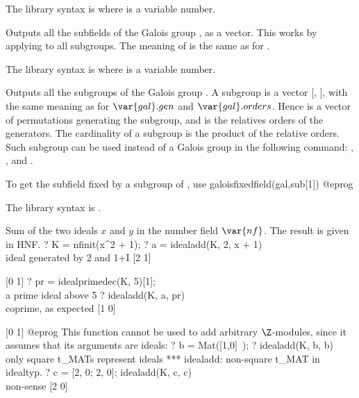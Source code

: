 The library syntax is  where  is a variable number.

\label{se:galoissubfields}
Outputs all the subfields of the Galois group , as a vector.
This works by applying  to all subgroups. The meaning of
 is the same as for .

The library syntax is  where  is a variable number.

\label{se:galoissubgroups}
Outputs all the subgroups of the Galois group . A subgroup is a
vector [, ], with the same meaning
as for $\var{gal}.gen$ and $\var{gal}.orders$. Hence  is a vector of
permutations generating the subgroup, and  is the relatives
orders of the generators. The cardinality of a subgroup is the product of the
relative orders. Such subgroup can be used instead of a Galois group in the
following command: , ,
 and .

To get the subfield fixed by a subgroup  of , use
\bprog
galoisfixedfield(gal,sub[1])
@eprog

The library syntax is .

\label{se:idealadd}
Sum of the two ideals $x$ and $y$ in the number field $\var{nf}$. The
result is given in HNF.
\bprog
 ? K = nfinit(x^2 + 1);
 ? a = idealadd(K, 2, x + 1)  \\ ideal generated by 2 and 1+I
 [2 1]

 [0 1]
 ? pr = idealprimedec(K, 5)[1];  \\ a prime ideal above 5
 ? idealadd(K, a, pr)     \\ coprime, as expected
 [1 0]

 [0 1]
@eprog\noindent
This function cannot be used to add arbitrary $\Z$-modules, since it assumes
that its arguments are ideals:
\bprog
  ? b = Mat([1,0]~);
  ? idealadd(K, b, b)     \\ only square t_MATs represent ideals
  *** idealadd: non-square t_MAT in idealtyp.
  ? c = [2, 0; 2, 0]; idealadd(K, c, c)   \\ non-sense
  [2 0]


